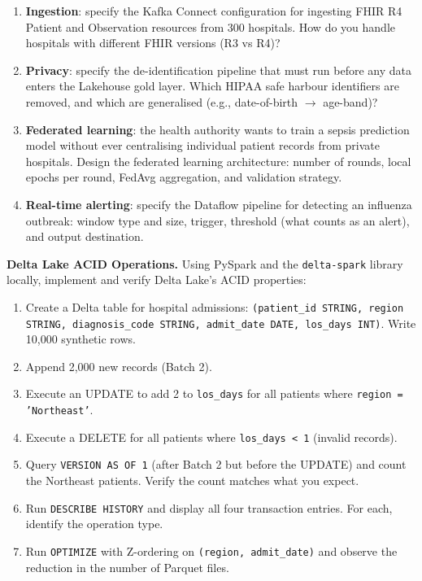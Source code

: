 \begin{enumerate}[label=(\alph*)]
  \item \textbf{Ingestion}: specify the Kafka Connect configuration for
        ingesting FHIR R4 Patient and Observation resources from 300
        hospitals. How do you handle hospitals with different FHIR
        versions (R3 vs R4)?
  \item \textbf{Privacy}: specify the de-identification pipeline that
        must run before any data enters the Lakehouse gold layer.
        Which HIPAA safe harbour identifiers are removed, and which are
        generalised (e.g., date-of-birth $\to$ age-band)?
  \item \textbf{Federated learning}: the health authority wants to train
        a sepsis prediction model without ever centralising individual
        patient records from private hospitals. Design the federated
        learning architecture: number of rounds, local epochs per round,
        FedAvg aggregation, and validation strategy.
  \item \textbf{Real-time alerting}: specify the Dataflow pipeline for
        detecting an influenza outbreak: window type and size, trigger,
        threshold (what counts as an alert), and output destination.
\end{enumerate}


\pe \textbf{Delta Lake ACID Operations.}
Using PySpark and the \texttt{delta-spark} library locally, implement
and verify Delta Lake's ACID properties:
\begin{enumerate}[label=(\alph*)]
  \item Create a Delta table for hospital admissions:
        \texttt{(patient\_id STRING, region STRING, diagnosis\_code STRING,
        admit\_date DATE, los\_days INT)}.
        Write 10{,}000 synthetic rows.
  \item Append 2{,}000 new records (Batch 2).
  \item Execute an UPDATE to add 2 to \texttt{los\_days} for all patients
        where \texttt{region = 'Northeast'}.
  \item Execute a DELETE for all patients where \texttt{los\_days < 1}
        (invalid records).
  \item Query \texttt{VERSION AS OF 1} (after Batch 2 but before the
        UPDATE) and count the Northeast patients. Verify the count matches
        what you expect.
  \item Run \texttt{DESCRIBE HISTORY} and display all four transaction
        entries. For each, identify the operation type.
  \item Run \texttt{OPTIMIZE} with Z-ordering on \texttt{(region,
        admit\_date)} and observe the reduction in the number of Parquet
        files.
\end{enumerate}

